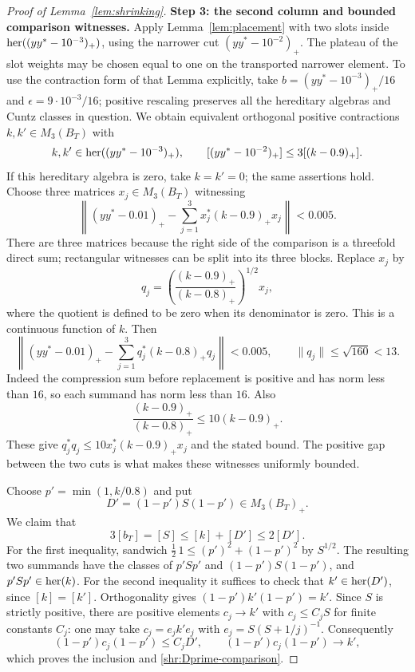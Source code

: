 \begin{proof}[Proof of Lemma~\ref{lem:shrinking}]
\medskip
\noindent\textbf{Step 3: the second column and bounded comparison witnesses.}
Apply Lemma~\ref{lem:placement} with two slots inside
$\operatorname{her}((yy^*-10^{-3})_+)$, using the narrower cut
$(yy^*-10^{-2})_+$.  The plateau of the slot weights may be chosen equal
to one on the transported narrower element.  To use the contraction
form of that Lemma explicitly, take
$b=(yy^*-10^{-3})_+/16$ and $\epsilon=9\cdot10^{-3}/16$;
positive rescaling preserves all the hereditary algebras and Cuntz
classes in question.  We obtain equivalent
orthogonal positive contractions $k,k'\in M_3(B_T)$ with
\begin{equation}\label{shr:k-comparison}
 k,k'\in\operatorname{her}((yy^*-10^{-3})_+),\qquad
 [(yy^*-10^{-2})_+]\le3[(k-0.9)_+].
\end{equation}
If this hereditary algebra is zero, take $k=k'=0$; the same assertions
hold.  Choose three matrices $x_j\in M_3(B_T)$ witnessing
\[
 \left\|(yy^*-0.01)_+-\sum_{j=1}^3x_j^*(k-0.9)_+x_j\right\|<0.005.
\]
There are three matrices because the right side of the comparison is a
threefold direct sum; rectangular witnesses can be split into its three
blocks.  Replace $x_j$ by
\[
 q_j=\left(\frac{(k-0.9)_+}{(k-0.8)_+}\right)^{1/2}x_j,
\]
where the quotient is defined to be zero when its denominator is zero.
This is a continuous function of $k$.  Then
\begin{equation}\label{shr:bounded-witnesses}
 \left\|(yy^*-0.01)_+-\sum_{j=1}^3q_j^*(k-0.8)_+q_j\right\|<0.005,
 \qquad \|q_j\|\le\sqrt{160}<13.
\end{equation}
Indeed the compression sum before replacement is positive and has norm
less than $16$, so each summand has norm less than $16$.  Also
\[
 \frac{(k-0.9)_+}{(k-0.8)_+}\le10(k-0.9)_+.
\]
These give $q_j^*q_j\le10x_j^*(k-0.9)_+x_j$ and the stated bound.  The
positive gap between the two cuts is what makes these witnesses uniformly
bounded.

Choose $p'=\min(1,k/0.8)$ and put
\[
 D'=(1-p')S(1-p')\in M_3(B_T)_+.
\]
We claim that
\begin{equation}\label{shr:Dprime-comparison}
 3[b_T]=[S]\le[k]+[D']\le2[D'].
\end{equation}
For the first inequality, sandwich
$\frac12\,1\le(p')^2+(1-p')^2$ by $S^{1/2}$.  The resulting two summands
have the classes of $p'Sp'$ and $(1-p')S(1-p')$, and
$p'Sp'\in\operatorname{her}(k)$.  For the second inequality it suffices to check that
$k'\in\operatorname{her}(D')$, since $[k]=[k']$.  Orthogonality gives
$(1-p')k'(1-p')=k'$.  Since $S$ is strictly positive, there are positive
elements $c_j\to k'$ with $c_j\le C_jS$ for finite constants $C_j$:
one may take $c_j=e_jk'e_j$ with
$e_j=S(S+1/j)^{-1}$.  Consequently
\[
 (1-p')c_j(1-p')\le C_jD',\qquad
 (1-p')c_j(1-p')\longrightarrow k',
\]
which proves the inclusion and \eqref{shr:Dprime-comparison}.


\end{proof}
